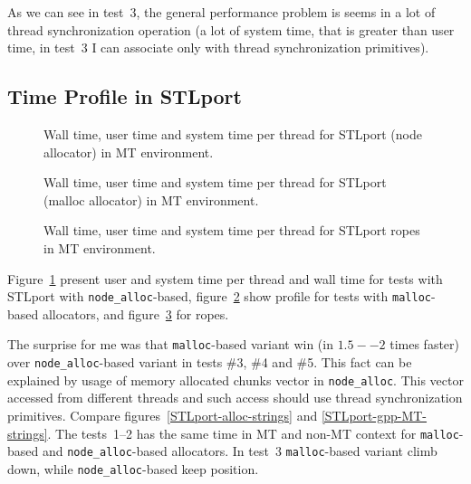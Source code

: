 \documentclass[a4paper]{article}
\providecommand{\STLport}{{\fontfamily{cmss}\selectfont STLport}}
\begin{document}
As we can see in test~3, the general performance problem
is seems in a lot of thread synchronization operation
(a lot of system time, that is greater than
user time, in test~3 I can associate only with thread synchronization primitives).



\subsection{Time Profile in \STLport}

\begin{figure}
  \begin{center}
    
  \end{center}
  \caption{
           Wall time, user time and system time per thread for 
           \STLport{} (node allocator) in MT environment.
           \label{STLport-MT-strings-t}}
\end{figure}

\begin{figure}
  \begin{center}
    
  \end{center}
  \caption{
           Wall time, user time and system time per thread for 
           \STLport{} (malloc allocator) in MT environment.
           \label{STLport-MT-strings-m}}
\end{figure}

\begin{figure}
  \begin{center}
    
  \end{center}
  \caption{
           Wall time, user time and system time per thread for 
           \STLport{} ropes in MT environment.
           \label{STLport-MT-strings-r}}
\end{figure}

Figure~\ref{STLport-MT-strings-t} present user and system time per thread
and wall time for tests with STLport with
\texttt{node\_alloc}-based,
figure~\ref{STLport-MT-strings-m} show profile for tests with \texttt{malloc}-based allocators, and figure~\ref{STLport-MT-strings-r} for ropes.

The surprise for me was that \texttt{malloc}-based variant
win (in $1.5--2$ times faster) over \texttt{node\_alloc}-based variant in tests \#3,
\#4 and \#5.
This fact can be explained by usage of memory allocated chunks vector
in \texttt{node\_alloc}. This vector accessed from different threads
and such access should use thread synchronization primitives.
Compare figures~\ref{STLport-alloc-strings} and \ref{STLport-gpp-MT-strings}.
The tests~1--2 has the same time in MT and non-MT context for
\texttt{malloc}-based and \texttt{node\_alloc}-based allocators.
In test~3 \texttt{malloc}-based variant climb down, while
\texttt{node\_alloc}-based keep position. 
\end{document}
